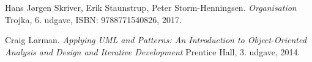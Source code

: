 \begin{thebibliography}{9}

Hans Jørgen Skriver, Erik Staunstrup, Peter Storm-Henningsen.
\textit{Organisation}
Trojka, 6. udgave, ISBN: 9788771540826, 2017.

Craig Larman.
\textit{Applying UML and Patterns: An Introduction to Object-Oriented Analysis and Design and Iterative Development}
Prentice Hall, 3. udgave, 2014.


\begin{comment}
\bibitem{latexcompanion} 
Michel Goossens, Frank Mittelbach, and Alexander Samarin. 
\textit{The \LaTeX\ Companion}. 
Addison-Wesley, Reading, Massachusetts, 1993.
 
\bibitem{einstein} 
Albert Einstein. 
\textit{Zur Elektrodynamik bewegter K{\"o}rper}. (German) 
[\textit{On the electrodynamics of moving bodies}]. 
Annalen der Physik, 322(10):891–921, 1905.
 
\bibitem{knuthwebsite} 
Knuth: Computers and Typesetting,
\\\texttt{http://www-cs-faculty.stanford.edu/\~{}uno/abcde.html}
\end{comment}
\end{thebibliography}
 
